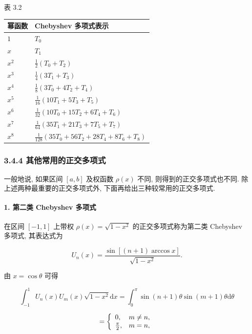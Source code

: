 \documentclass[
  10pt,
  fontset=fandol]{ctexart}
\newcounter{none} %
\begin{document}
表 3.2

{\def\LTcaptype{none} %
\begin{longtable}[]{@{}ll@{}}
\toprule\noalign{}
幂函数 & Chebyshev 多项式表示 \\
\midrule\noalign{}
\endhead
\bottomrule\noalign{}
\endlastfoot
\(1\) & \(T_0\) \\
\(x\) & \(T_1\) \\
\(x^2\) & \(\frac12(T_0+T_2)\) \\
\(x^3\) & \(\frac14(3T_1+T_3)\) \\
\(x^4\) & \(\frac18(3T_0+4T_2+T_4)\) \\
\(x^5\) & \(\frac1{16}(10T_1+5T_3+T_5)\) \\
\(x^6\) & \(\frac1{32}(10T_0+15T_2+6T_4+T_6)\) \\
\(x^7\) & \(\frac1{64}(35T_1+21T_3+7T_5+T_7)\) \\
\(x^8\) & \(\frac1{128}(35T_0+56T_2+28T_4+8T_6+T_8)\) \\
\end{longtable}
}

\subsubsection{3.4.4 其他常用的正交多项式}\label{ux5176ux4ed6ux5e38ux7528ux7684ux6b63ux4ea4ux591aux9879ux5f0f}

一般地说, 如果区间 \([a,b]\) 及权函数 \(\rho(x)\) 不同, 则得到的正交多项式也不同. 除上述两种最重要的正交多项式外, 下面再给出三种较常用的正交多项式.

\paragraph{1. 第二类 Chebyshev 多项式}\label{ux7b2cux4e8cux7c7b-chebyshev-ux591aux9879ux5f0f}

在区间 \([-1,1]\) 上带权 \(\rho(x) = \sqrt{1-x^2}\) 的正交多项式称为第二类 Chebyshev 多项式, 其表达式为

\[
U_n(x) = \frac{\sin[(n+1)\arccos x]}{\sqrt{1-x^2}}. \tag{3.4.10}
\]

由 \(x=\cos\theta\) 可得

\[
\int_{-1}^{1} U_n(x) U_m(x) \sqrt{1-x^2} \mathrm{d}x = \int_{0}^{\pi} \sin(n+1)\theta \sin(m+1)\theta \mathrm{d}\theta
\]

\[
= \left\{ \begin{array}{l l} 0, & m \neq n, \\ \frac{\pi}{2}, & m=n, \end{array} \right.
\]
\end{document}
